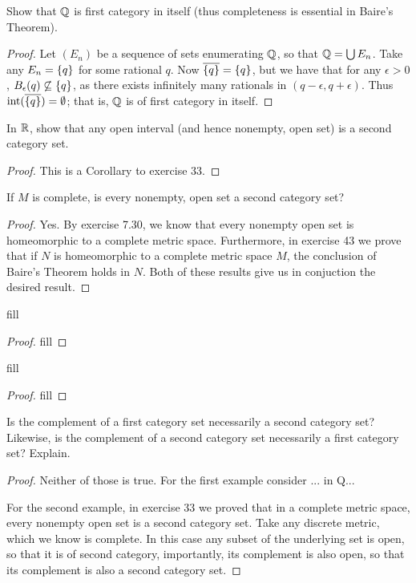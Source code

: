 \begin{exercise}{31}
Show that $\mathbb{Q}$ is first category in itself (thus completeness is essential in Baire's Theorem).
\end{exercise}
\begin{proof}
Let $(E_n)$ be a sequence of sets enumerating $\mathbb{Q}$, so that $\mathbb{Q} = \bigcup E_n$.
Take any $E_n = \{q\}$ for some rational $q$.
Now $\overline{\{q\}} = \{q\}$, but we have that for any $\epsilon > 0$, $B_\epsilon(q) \not\subseteq \{q\}$, as there exists infinitely many rationals in $(q-\epsilon, q+\epsilon)$.
Thus $\operatorname{int}(\overline{\{q\}}) = \emptyset$;
that is, $\mathbb{Q}$ is of first category in itself.
\end{proof} 

\begin{exercise}{32}
In $\mathbb{R}$, show that any open interval (and hence nonempty, open set) is a second category set.
\end{exercise}
\begin{proof}
This is a Corollary to exercise 33.
\end{proof} 

\begin{exercise}{33}
If $M$ is complete, is every nonempty, open set a second category set?
\end{exercise}
\begin{proof}
Yes.
By exercise 7.30, we know that every nonempty open set is homeomorphic to a complete metric space.
Furthermore, in exercise 43 we prove that if $N$ is homeomorphic to a complete metric space $M$, the conclusion of Baire's Theorem holds in $N$.
Both of these results give us in conjuction the desired result.
\end{proof} 

\begin{exercise}{36}
fill
\end{exercise}
\begin{proof}
fill
\end{proof} 

\begin{exercise}{37}
fill
\end{exercise}
\begin{proof}
fill
\end{proof} 

\begin{exercise}{38}
Is the complement of a first category set necessarily a second category set?
Likewise, is the complement of a second category set necessarily a first category set?
Explain.
\end{exercise}
\begin{proof}
Neither of those is true.
For the first example consider ... in Q...

For the second example, in exercise 33 we proved that in a complete metric space, every nonempty open set is a second category set.
Take any discrete metric, which we know is complete.
In this case any subset of the underlying set is open, so that it is of second category, importantly, its complement is also open, so that its complement is also a second category set.
\end{proof} 

